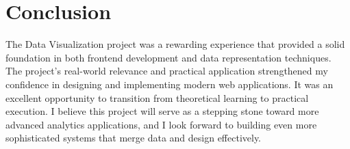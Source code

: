 
\section{Conclusion}
The Data Visualization project was a rewarding experience that provided a solid foundation in both frontend development and data representation techniques. The project's real-world relevance and practical application strengthened my confidence in designing and implementing modern web applications. It was an excellent opportunity to transition from theoretical learning to practical execution. I believe this project will serve as a stepping stone toward more advanced analytics applications, and I look forward to building even more sophisticated systems that merge data and design effectively.





